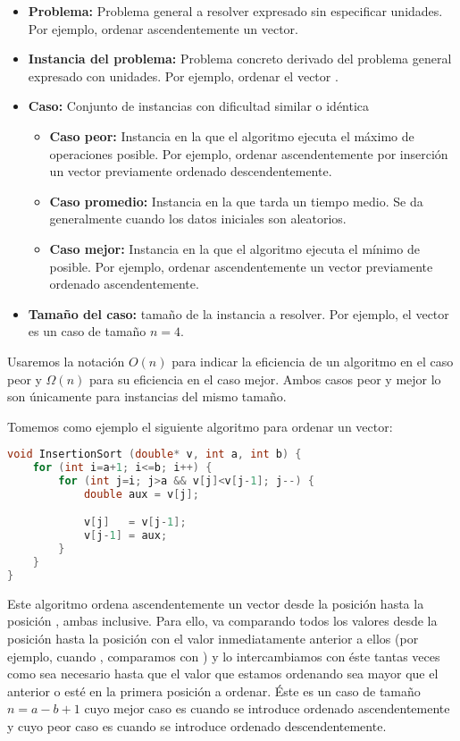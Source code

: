 \begin{itemize}
	\item\textbf{Problema:} Problema general a resolver expresado sin especificar unidades. Por ejemplo, ordenar ascendentemente un vector.
	\item\textbf{Instancia del problema:} Problema concreto derivado del problema general expresado con unidades. Por ejemplo, ordenar el vector \code{[3,5,1,2]}.

\pagebreak

	\item\textbf{Caso:} Conjunto de instancias con dificultad similar o idéntica
	\begin{itemize}
		\item\textbf{Caso peor:} Instancia en la que el algoritmo ejecuta el máximo de operaciones posible. Por ejemplo, ordenar ascendentemente por inserción un vector previamente ordenado descendentemente.
		\item\textbf{Caso promedio:} Instancia en la que tarda un tiempo medio. Se da generalmente cuando los datos iniciales son aleatorios.
		\item\textbf{Caso mejor:} Instancia en la que el algoritmo ejecuta el mínimo de posible. Por ejemplo, ordenar ascendentemente un vector previamente ordenado ascendentemente.
	\end{itemize}
	\item\textbf{Tamaño del caso:} tamaño de la instancia a resolver. Por ejemplo, el vector \code{[3,5,1,2]} es un caso de tamaño $n=4$.
\end{itemize}

Usaremos la notación $O(n)$ para indicar la eficiencia de un algoritmo en el caso peor y $\Omega(n)$ para su eficiencia en el caso mejor.
Ambos casos peor y mejor lo son únicamente para instancias del mismo tamaño.

Tomemos como ejemplo el siguiente algoritmo para ordenar un vector:

\begin{lstlisting}[language=C++]
void InsertionSort (double* v, int a, int b) {
	for (int i=a+1; i<=b; i++) {
		for (int j=i; j>a && v[j]<v[j-1]; j--) {
			double aux = v[j];

			v[j]   = v[j-1];
			v[j-1] = aux;
		}
	}
}
\end{lstlisting}

Este algoritmo ordena ascendentemente un vector  desde la posición  hasta la posición , ambas inclusive.
Para ello, va comparando todos los valores desde la posición  hasta la posición  con el valor inmediatamente anterior a ellos (por ejemplo, cuando , comparamos  con ) y lo intercambiamos con éste tantas veces como sea necesario hasta que el valor que estamos ordenando sea mayor que el anterior o esté en la primera posición a ordenar.
Éste es un caso de tamaño $n=a-b+1$ cuyo mejor caso es cuando  se introduce ordenado ascendentemente y cuyo peor caso es cuando  se introduce ordenado descendentemente.

